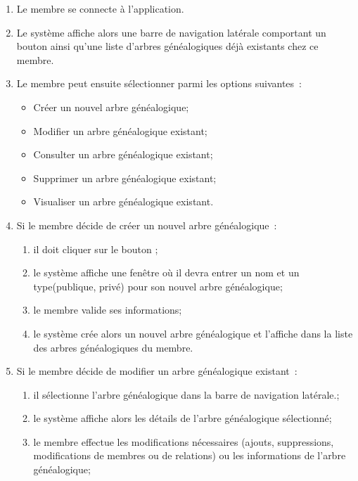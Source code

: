 \begin{enumerate}

  \item  Le membre se connecte à l’application.

  \item Le système affiche alors une barre de navigation latérale comportant un
    bouton  ainsi qu’une liste d’arbres généalogiques déjà
    existants chez ce membre.

  \item Le membre peut ensuite sélectionner parmi les options suivantes :
    \begin{itemize}
      \item Créer un nouvel arbre généalogique;
      \item Modifier un arbre généalogique existant;
      \item Consulter un arbre généalogique existant;
      \item Supprimer un arbre généalogique existant;
      \item Visualiser un arbre généalogique existant.
    \end{itemize}

  \item Si le membre décide de créer un nouvel arbre généalogique :
    \begin{enumerate}
      \item il doit cliquer sur le bouton ;
      \item le système affiche une fenêtre où il devra entrer un nom et un type(publique, privé)
        pour son nouvel arbre généalogique;
      \item le membre valide ses informations;
      \item le système crée alors un nouvel arbre généalogique et l’affiche dans la liste des arbres
        généalogiques du membre.
    \end{enumerate}

  \item  Si le membre décide de modifier un arbre généalogique existant :
    \begin{enumerate}
      \item il sélectionne l’arbre généalogique dans la barre de navigation latérale.;
      \item le système affiche alors les détails de l’arbre généalogique sélectionné;
      \item le membre effectue les modifications nécessaires (ajouts,
        suppressions, modifications de membres ou de relations) ou les
        informations de l’arbre généalogique;


\end{enumerate}
\end{enumerate}
